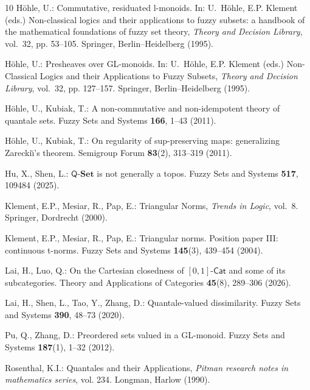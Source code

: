 \documentclass{birkau}
\theoremstyle{plain}
\theoremstyle{definition}
\numberwithin{equation}{section}
\begin{document}
\begin{thebibliography}{10}
H{\"o}hle, U.: Commutative, residuated l-monoids.
\newblock In: U.~H\"{o}hle, E.P. Klement (eds.) Non-classical logics and their
  applications to fuzzy subsets: a handbook of the mathematical foundations of
  fuzzy set theory, \emph{Theory and Decision Library}, vol.~32, pp. 53--105.
  Springer, Berlin--Heidelberg (1995).

H{\"o}hle, U.: Presheaves over {GL}-monoids.
\newblock In: U.~H\"{o}hle, E.P. Klement (eds.) Non-Classical Logics and their
  Applications to Fuzzy Subsets, \emph{Theory and Decision Library}, vol.~32,
  pp. 127--157. Springer, Berlin--Heidelberg (1995).

H{\"o}hle, U., Kubiak, T.: A non-commutative and non-idempotent theory of
  quantale sets.
\newblock Fuzzy Sets and Systems \textbf{166}, 1--43 (2011).

H{\"o}hle, U., Kubiak, T.: On regularity of sup-preserving maps: generalizing
  {Zarecki{\u{\i}}}'s theorem.
\newblock Semigroup Forum \textbf{83}(2), 313--319 (2011).

Hu, X., Shen, L.: $\mathsf{Q}\text{-}\mathbf{Set}$ is not generally a topos.
\newblock Fuzzy Sets and Systems \textbf{517}, 109484 (2025).

Klement, E.P., Mesiar, R., Pap, E.: Triangular Norms, \emph{Trends in Logic},
  vol.~8.
\newblock Springer, Dordrecht (2000).

Klement, E.P., Mesiar, R., Pap, E.: Triangular norms. {Position} paper {III}:
  continuous t-norms.
\newblock Fuzzy Sets and Systems \textbf{145}(3), 439--454 (2004).

Lai, H., Luo, Q.: On the {Cartesian} closedness of
  {$[0,1]\text{-}\mathsf{Cat}$} and some of its subcategories.
\newblock Theory and Applications of Categories \textbf{45}(8), 289--306
  (2026).

Lai, H., Shen, L., Tao, Y., Zhang, D.: Quantale-valued dissimilarity.
\newblock Fuzzy Sets and Systems \textbf{390}, 48--73 (2020).

Pu, Q., Zhang, D.: Preordered sets valued in a {GL}-monoid.
\newblock Fuzzy Sets and Systems \textbf{187}(1), 1--32 (2012).

Rosenthal, K.I.: Quantales and their Applications, \emph{Pitman research notes
  in mathematics series}, vol. 234.
\newblock Longman, Harlow (1990).


\end{thebibliography}
\end{document}
